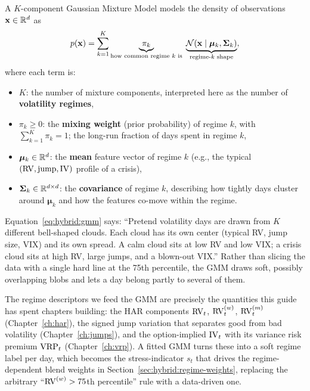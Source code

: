 \begin{definition}
A $K$-component Gaussian Mixture Model models the density of observations
$\mathbf{x} \in \mathbb{R}^d$ as
\begin{equation}\label{eq:hybrid:gmm}
  p(\mathbf{x}) = \sum_{k=1}^{K}
    \underbrace{\pi_k}_{\text{how common regime }k\text{ is}}\;
    \underbrace{\mathcal{N}(\mathbf{x} \mid \bm{\mu}_k, \bm{\Sigma}_k)}_{\text{regime-}k\text{ shape}},
\end{equation}
where each term is:
\begin{itemize}
  \item $K$: the number of mixture components, interpreted here as the
        number of \textbf{volatility regimes},
  \item $\pi_k \geq 0$: the \textbf{mixing weight} (prior probability)
        of regime $k$, with $\sum_{k=1}^K \pi_k = 1$; the long-run
        fraction of days spent in regime $k$,
  \item $\bm{\mu}_k \in \mathbb{R}^d$: the \textbf{mean} feature vector of
        regime $k$ (e.g., the typical $(\operatorname{RV}, \text{jump}, \operatorname{IV})$ profile
        of a crisis),
  \item $\bm{\Sigma}_k \in \mathbb{R}^{d \times d}$: the \textbf{covariance}
        of regime $k$, describing how tightly days cluster around
        $\bm{\mu}_k$ and how the features co-move within the regime.
\end{itemize}

\begin{intuition}
Equation~\eqref{eq:hybrid:gmm} says: ``Pretend volatility days are drawn
from $K$ different bell-shaped clouds.  Each cloud has its own center
(typical RV, jump size, VIX) and its own spread.  A calm cloud sits at low
RV and low VIX; a crisis cloud sits at high RV, large jumps, and a
blown-out VIX.''  Rather than slicing the data with a single hard line at
the 75th percentile, the GMM draws soft, possibly overlapping blobs and
lets a day belong partly to several of them.
\end{intuition}

\begin{projectconnection}
The regime descriptors we feed the GMM are precisely the quantities this
guide has spent chapters building: the HAR components $\operatorname{RV}_t$,
$\operatorname{RV}_t^{(w)}$, $\operatorname{RV}_t^{(m)}$ (Chapter~\ref{ch:har}), the signed jump
variation that separates good from bad volatility
(Chapter~\ref{ch:jumps}), and the option-implied $\operatorname{IV}_t$ with its
variance risk premium $\operatorname{VRP}_t$ (Chapter~\ref{ch:vrp}).  A fitted GMM turns
these into a soft regime label per day, which becomes the
stress-indicator $s_t$ that drives the regime-dependent blend weights in
Section~\ref{sec:hybrid:regime-weights}, replacing the arbitrary
``$\operatorname{RV}^{(w)} > 75$th percentile'' rule with a data-driven one.
\end{projectconnection}
\end{definition}

